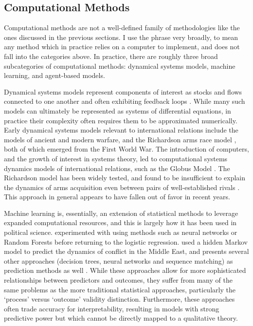 \subsection*{Computational Methods}\label{computational-methods}

Computational methods are not a well-defined family of methodologies like the ones discussed in the previous sections. I use the phrase very broadly, to mean any method which in practice relies on a computer to implement, and does not fall into the categories above. In practice, there are roughly three broad subcategories of computational methods: dynamical systems models, machine learning, and agent-based models.

Dynamical systems models represent components of interest as stocks and flows connected to one another and often exhibiting feedback loops \citep{gilbert_2005}. While many such models can ultimately be represented as systems of differential equations, in practice their complexity often requires them to be approximated numerically. Early dynamical systems models relevant to international relations include the \citet{lanchester_1916} models of ancient and modern warfare, and the Richardson arms race model \citep{rapoport_1957}, both of which emerged from the First World War. The introduction of computers, and the growth of interest in systems theory, led to computational systems dynamics models of international relations, such as the Globus Model \citep{bremer_1987}. The Richardson model has been widely tested, and found to be insufficient to explain the dynamics of arms acquisition even between pairs of well-established rivals \citep{dunne_1999}. This approach in general appears to have fallen out of favor in recent years.

Machine learning is, essentially, an extension of statistical methods to leverage expanded computational resources, and this is largely how it has been used in political science. \citet{goldstone_2005} experimented with using methods such as neural networks or Random Forests \citep{breiman_2001} before returning to the logistic regression. \citet{schrodt_1997} used a hidden Markov model to predict the dynamics of conflict in the Middle East, and presents several other approaches (decision trees, neural networks and sequence matching) as prediction methods as well \citep{schrodt_2004} . While these approaches allow for more sophisticated relationships between predictors and outcomes, they suffer from many of the same problems as the more traditional statistical approaches, particularly the `process' versus `outcome' validity distinction. Furthermore, these approaches often trade accuracy for interpretability, resulting in models with strong predictive power but which cannot be directly mapped to a qualitative theory.

